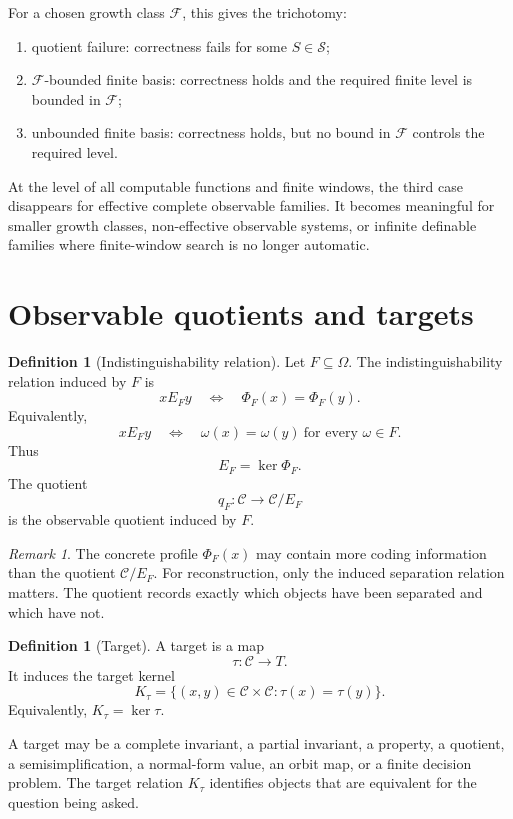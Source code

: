 \documentclass[11pt]{article}
\theoremstyle{definition}
\newtheorem{definition}[theorem]{Definition}
\theoremstyle{remark}
\newtheorem{remark}[theorem]{Remark}
\begin{document}
For a chosen growth class \(\mathcal F\), this gives the trichotomy:
\begin{enumerate}[label=(\roman*)]
\item quotient failure: correctness fails for some \(S\in\mathcal S\);
\item \(\mathcal F\)-bounded finite basis: correctness holds and the required finite level is bounded in \(\mathcal F\);
\item unbounded finite basis: correctness holds, but no bound in \(\mathcal F\) controls the required level.
\end{enumerate}
At the level of all computable functions and finite windows, the third case disappears for effective complete observable families.  It becomes meaningful for smaller growth classes, non-effective observable systems, or infinite definable families where finite-window search is no longer automatic.

\section{Observable quotients and targets}

\begin{definition}[Indistinguishability relation]
Let \(F\subseteq\Omega\).  The indistinguishability relation induced by \(F\) is
\[
xE_Fy
\quad\Longleftrightarrow\quad
\Phi_F(x)=\Phi_F(y).
\]
Equivalently,
\[
xE_Fy
\quad\Longleftrightarrow\quad
\omega(x)=\omega(y)\ \text{for every }\omega\in F.
\]
Thus
\[
E_F=\ker\Phi_F.
\]
The quotient
\[
q_F:\mathcal C\to \mathcal C/E_F
\]
is the observable quotient induced by \(F\).
\end{definition}

\begin{remark}
The concrete profile \(\Phi_F(x)\) may contain more coding information than the quotient \(\mathcal C/E_F\).  For reconstruction, only the induced separation relation matters.  The quotient records exactly which objects have been separated and which have not.
\end{remark}

\begin{definition}[Target]
A target is a map
\[
\tau:\mathcal C\to T.
\]
It induces the target kernel
\[
K_\tau=\{(x,y)\in\mathcal C\times\mathcal C:\tau(x)=\tau(y)\}.
\]
Equivalently, \(K_\tau=\ker\tau\).
\end{definition}

A target may be a complete invariant, a partial invariant, a property, a quotient, a semisimplification, a normal-form value, an orbit map, or a finite decision problem.  The target relation \(K_\tau\) identifies objects that are equivalent for the question being asked.
\end{document}
